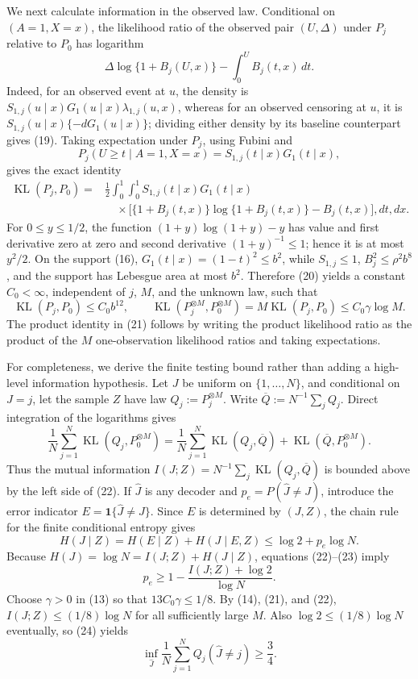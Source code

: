 We next calculate information in the observed law. Conditional on \((A=1,X=x)\), the likelihood ratio of the observed pair \((U,\Delta)\) under \(P_j\) relative to \(P_0\) has logarithm
\[
\Delta\log\{1+B_j(U,x)\}-\int_0^U B_j(t,x)\,dt. \tag{19}
\]
Indeed, for an observed event at \(u\), the density is \(S_{1,j}(u\mid x)G_1(u\mid x)\lambda_{1,j}(u,x)\), whereas for an observed censoring at \(u\), it is \(S_{1,j}(u\mid x)\{-dG_1(u\mid x)\}\); dividing either density by its baseline counterpart gives (19). Taking expectation under \(P_j\), using Fubini and
\[
P_j(U\ge t\mid A=1,X=x)=S_{1,j}(t\mid x)G_1(t\mid x),
\]
gives the exact identity
\[
\begin{split}
\operatorname{KL}(P_j,P_0)
={}&\frac12\int_0^1\int_0^1
S_{1,j}(t\mid x)G_1(t\mid x)\\
&\quad\times\bigl[\{1+B_j(t,x)\}\log\{1+B_j(t,x)\}-B_j(t,x)\bigr],dt,dx.
\end{split} \tag{20}
\]
For \(0\le y\le1/2\), the function \((1+y)\log(1+y)-y\) has value and first derivative zero at zero and second derivative \((1+y)^{-1}\le1\); hence it is at most \(y^2/2\). On the support (16), \(G_1(t\mid x)=(1-t)^2\le b^2\), while \(S_{1,j}\le1\), \(B_j^2\le\rho^2b^8\), and the support has Lebesgue area at most \(b^2\). Therefore (20) yields a constant \(C_0<\infty\), independent of \(j\), \(M\), and the unknown law, such that
\[
\operatorname{KL}(P_j,P_0)\le C_0b^{12},
\qquad
\operatorname{KL}(P_j^{\otimes M},P_0^{\otimes M})
=M\operatorname{KL}(P_j,P_0)
\le C_0\gamma\log M. \tag{21}
\]
The product identity in (21) follows by writing the product likelihood ratio as the product of the \(M\) one-observation likelihood ratios and taking expectations.

For completeness, we derive the finite testing bound rather than adding a high-level information hypothesis. Let \(J\) be uniform on \(\{1,\ldots,N\}\), and conditional on \(J=j\), let the sample \(Z\) have law \(Q_j:=P_j^{\otimes M}\). Write \(\overline Q:=N^{-1}\sum_jQ_j\). Direct integration of the logarithms gives
\[
\frac1N\sum_{j=1}^N\operatorname{KL}(Q_j,P_0^{\otimes M})
=\frac1N\sum_{j=1}^N\operatorname{KL}(Q_j,\overline Q)
+\operatorname{KL}(\overline Q,P_0^{\otimes M}). \tag{22}
\]
Thus the mutual information \(I(J;Z)=N^{-1}\sum_j\operatorname{KL}(Q_j,\overline Q)\) is bounded above by the left side of (22). If \(\widehat J\) is any decoder and \(p_e=P(\widehat J\ne J)\), introduce the error indicator \(E=\mathbf 1\{\widehat J\ne J\}\). Since \(E\) is determined by \((J,Z)\), the chain rule for the finite conditional entropy gives
\[
H(J\mid Z)=H(E\mid Z)+H(J\mid E,Z)
\le\log2+p_e\log N. \tag{23}
\]
Because \(H(J)=\log N=I(J;Z)+H(J\mid Z)\), equations (22)--(23) imply
\[
p_e\ge1-\frac{I(J;Z)+\log2}{\log N}. \tag{24}
\]
Choose \(\gamma>0\) in (13) so that \(13C_0\gamma\le1/8\). By (14), (21), and (22), \(I(J;Z)\le(1/8)\log N\) for all sufficiently large \(M\). Also \(\log2\le(1/8)\log N\) eventually, so (24) yields
\[
\inf_{\widehat J}\frac1N\sum_{j=1}^NQ_j(\widehat J\ne j)\ge\frac34. \tag{25}
\]


